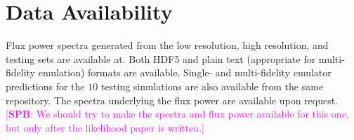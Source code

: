 \documentclass[a4paper,11pt]{article}
\newcommand{\spb}[1]{{\textcolor{magenta}{[{\bf SPB}: #1]}}}
\begin{document}
\section*{Data Availability}
Flux power spectra generated from the low resolution, high resolution, and testing sets are available at.
Both HDF5 and plain text (appropriate for multi-fidelity emulation) formats are available.
Single- and multi-fidelity emulator predictions for the $10$ testing simulations are also available from the same repository.
The spectra underlying the flux power are available upon request.
\spb{We should try to make the spectra and flux power available for this one, but only after the likelihood paper is written.}




\appendix

\label{lastpage}
\end{document}
